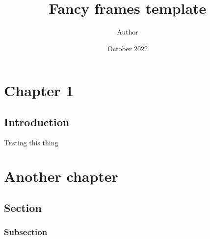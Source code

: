 \documentclass[twoside]{book}
\title{Fancy frames template}
\author{Author}
\date{October 2022}
\begin{document}

\maketitle
\tableofcontents
\mainmatter

\chapter{Chapter 1}

\section{Introduction}

\lettrine{T}esting this thing

\chapter{Another chapter}

\section{Section}
\subsection{Subsection}
\end{document}

